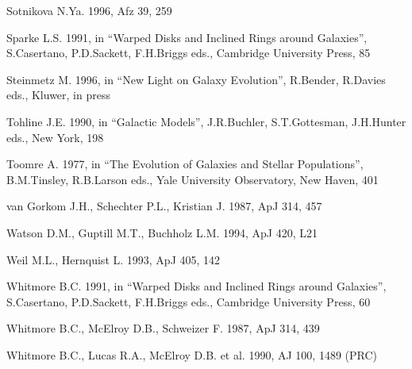 \begin{thebibliography}{}
\bibitem{} Sotnikova N.Ya. 1996, Afz 39, 259

\bibitem{} Sparke L.S. 1991, in ``Warped Disks and Inclined Rings around
Galaxies'', S.Casertano, P.D.Sackett, F.H.Briggs eds., Cambridge University
Press, 85

\bibitem{} Steinmetz M. 1996, in ``New Light on Galaxy Evolution'', R.Bender,
R.Davies eds., Kluwer, in press 

\bibitem{} Tohline J.E. 1990, in ``Galactic Models'', J.R.Buchler,
S.T.Gottesman, J.H.Hunter eds., New York, 198

\bibitem{} Toomre A. 1977, in ``The Evolution of Galaxies and Stellar
Populations'', B.M.Tinsley, R.B.Larson eds., Yale University Observatory,
New Haven, 401

\bibitem{} van Gorkom J.H., Schechter P.L., Kristian J. 1987, ApJ 314, 457

\bibitem{} Watson D.M., Guptill M.T., Buchholz L.M. 1994, ApJ 420, L21

\bibitem{} Weil M.L., Hernquist L. 1993, ApJ 405, 142

\bibitem{} Whitmore B.C. 1991, in ``Warped Disks and Inclined Rings around
Galaxies'', S.Casertano, P.D.Sackett, F.H.Briggs eds., Cambridge University
Press, 60

\bibitem{} Whitmore B.C., McElroy D.B., Schweizer F. 1987, ApJ 314, 439

\bibitem{} Whitmore B.C., Lucas R.A., McElroy D.B. et al. 1990,
AJ 100, 1489 (PRC)

\end{thebibliography}



